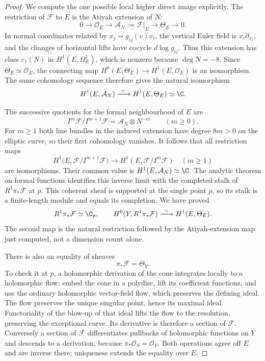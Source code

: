\begin{proof}
We compute the one possible local higher direct image explicitly.
The restriction of $\mathcal F$ to $E$ is the Atiyah extension
of $N$:
\[
 0\longrightarrow\mathcal O_E
 \longrightarrow\mathcal A_N:=\mathcal F|_E
 \longrightarrow\Theta_E\longrightarrow0.
\]
In normal coordinates related by $x_j=g_{ij}(v)x_i$, the
vertical Euler field is $x_i\partial_{x_i}$, and the changes of
horizontal lifts have cocycle $d\log g_{ij}$.
Thus this extension has class $c_1(N)$ in
$H^1(E,\Omega^1_E)$, which is nonzero because $\deg N=-8$.
Since $\Theta_E\simeq\mathcal O_E$, the connecting map
$H^0(E,\Theta_E)\to H^1(E,\mathcal O_E)$ is an isomorphism.
The same cohomology sequence therefore gives the natural
isomorphism
\[
 H^1(E,\mathcal A_N)\xrightarrow{\ \sim\ }
 H^1(E,\Theta_E)\simeq\C.
\]

The successive quotients for the formal neighbourhood of $E$ are
\[
 I^m\mathcal F/I^{m+1}\mathcal F
     =\mathcal A_N\otimes N^{-m}\qquad(m\ge0).
\]
For $m\ge1$ both line bundles in the induced extension have
degree $8m>0$ on the elliptic curve, so their first cohomology
vanishes.  It follows that all restriction maps
\[
 H^1\bigl(E,\mathcal F/I^{m+1}\mathcal F\bigr)
 \longrightarrow H^1(E,\mathcal F/I^m\mathcal F)
 \quad(m\ge1)
\]
are isomorphisms.  Their common value is
$H^1(E,\mathcal A_N)\simeq\C$.
The analytic theorem on formal functions
\citep[Section~6, Hauptsatz~IIa, p.~59]{Grauert60push}
identifies this inverse limit with the completed stalk of
$R^1\pi_*\mathcal F$ at $p$.
This coherent sheaf is supported at the single point $p$,
so its stalk is a finite-length module and equals its completion.
We have proved
\[
 R^1\pi_*\mathcal F\simeq\C_p,
 \qquad
 H^0(Y,R^1\pi_*\mathcal F)
    \xrightarrow{\ \sim\ }H^1(E,\Theta_E).
\]
The second map is the natural restriction followed by the
Atiyah-extension map just computed, not a dimension count alone.

There is also an equality of sheaves
\[
 \pi_*\mathcal F=\Theta_Y.
\]
To check it at $p$, a holomorphic derivation of the cone
integrates locally to a holomorphic flow: embed the cone in a
polydisc, lift its coefficient functions, and use the ordinary
holomorphic vector-field flow, which preserves the defining ideal.
The flow preserves the unique singular point, hence its maximal
ideal.  Functoriality of the blow-up of that ideal lifts the flow
to the resolution, preserving the exceptional curve.
Its derivative is therefore a section of $\mathcal F$.
Conversely a section of $\mathcal F$ differentiates pullbacks
of holomorphic functions on $Y$ and descends to a derivation,
because $\pi_*\mathcal O_S=\mathcal O_Y$.
Both operations agree off $E$ and are inverse there; uniqueness
extends the equality over $E$.


\end{proof}
